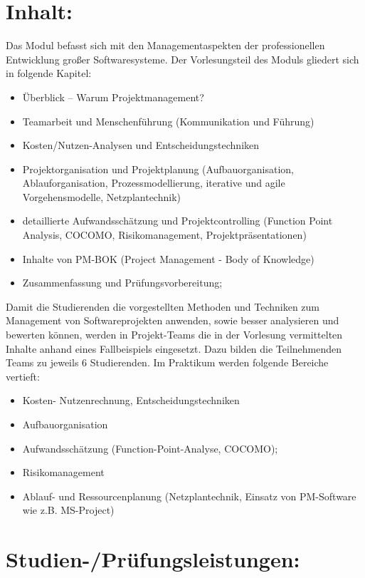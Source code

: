 \section{Inhalt:}\label{inhalt-20}

Das Modul befasst sich mit den Managementaspekten der professionellen
Entwicklung großer Softwaresysteme. Der Vorlesungsteil des Moduls
gliedert sich in folgende Kapitel:

\begin{itemize}
\tightlist
\item
  Überblick -- Warum Projektmanagement?
\item
  Teamarbeit und Menschenführung (Kommunikation und Führung)
\item
  Kosten/Nutzen-Analysen und Entscheidungstechniken
\item
  Projektorganisation und Projektplanung (Aufbauorganisation,
  Ablauforganisation, Prozessmodellierung, iterative und agile
  Vorgehensmodelle, Netzplantechnik)
\item
  detaillierte Aufwandsschätzung und Projektcontrolling (Function Point
  Analysis, COCOMO, Risikomanagement, Projektpräsentationen)
\item
  Inhalte von PM-BOK (Project Management - Body of Knowledge)
\item
  Zusammenfassung und Prüfungsvorbereitung;
\end{itemize}

Damit die Studierenden die vorgestellten Methoden und Techniken zum
Management von Softwareprojekten anwenden, sowie besser analysieren und
bewerten können, werden in Projekt-Teams die in der Vorlesung
vermittelten Inhalte anhand eines Fallbeispiels eingesetzt. Dazu bilden
die Teilnehmenden Teams zu jeweils 6 Studierenden. Im Praktikum werden
folgende Bereiche vertieft:

\begin{itemize}
\tightlist
\item
  Kosten- Nutzenrechnung, Entscheidungstechniken
\item
  Aufbauorganisation
\item
  Aufwandsschätzung (Function-Point-Analyse, COCOMO);
\item
  Risikomanagement
\item
  Ablauf- und Ressourcenplanung (Netzplantechnik, Einsatz von
  PM-Software wie z.B. MS-Project)
\end{itemize}

\section{Studien-/Prüfungsleistungen:}\label{studien-pruxfcfungsleistungen-20}

